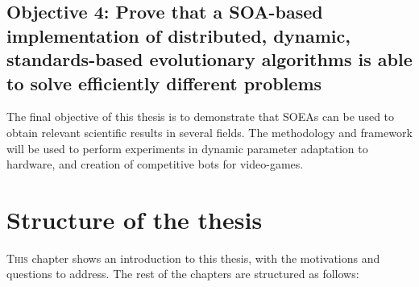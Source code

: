 \newcommand{\objectiveresearch}{Prove that a SOA-based implementation of distributed, dynamic, standards-based evolutionary algorithms is able to solve efficiently different problems} %
\subsection*{Objective 4: \objectiveresearch}
\label{subsec:intro:obj:applications}
The final objective of this thesis is to demonstrate that SOEAs can be used to obtain relevant scientific results in several fields. The methodology and framework will be used to perform experiments in dynamic parameter adaptation to hardware, and creation of competitive bots for video-games. %



\section{Structure of the thesis}
\label{sec:intro:structure}

\lettrine{T}{his} chapter shows an introduction to this thesis, with the
motivations and questions to address. %
The rest of the chapters are structured as follows:


